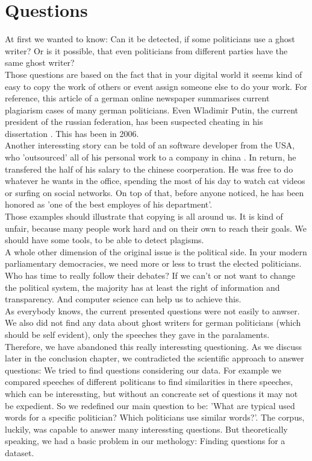 \documentclass[12pt,paper=a4,nenglish]{scrreprt}
\begin{document}
\section{Questions}
At first we wanted to know: Can it be detected, if some politicians
use a ghost writer? Or is it possible, that even politicians from different
parties have the same ghost writer? \\ 
Those questions are based on the fact that in your digital world it
seems kind of easy to copy the work of others or event assign someone else to do
your work. For reference, this article \cite{plagiat_1} of a german online newspaper 
summarises current plagiarism cases of many german politicians. 
Even Wladimir Putin, the current president of the russian federation, has been
suspected cheating in his dissertation \cite{plagiat_2}. This has been in
2006. \\
Another interessting story can be told of an software developer from the USA,
who 'outsourced' all of his personal work to a company in china
\cite{plagiat_3}. In return, he transfered the half of his salary to the chinese
coorperation. He was free to do whatever he wants in the office, spending the
most of his day to watch cat videos or surfing on social networks. 
On top of that, before anyone noticed, he has been honored as 'one of the best
employes of his department'. \\
Those examples should illustrate that copying is all around us. 
It is kind of unfair, because many people work hard and on their own to reach
their goals. We should have some tools, to be able to detect plagisms.\\
A whole other dimension of the original issue is the political side. In your
modern parliamentary democracies, we need more or less to trust the elected
politicians. Who has time to really follow their debates? If we can't or
not want to change the political system, the majority has at least the right of
information and transparency. And computer science can help us to achieve this.
\\
As everybody knows, the current presented questions were not easily to
anwser. We also did not find any data about ghost writers for german
politicians (which should be self evident), only the speeches they gave in the
paralaments.
Therefore, we have abandoned this really interessting questioning. As
we discuss later in the conclusion chapter, we contradicted the scientific
approach to answer questions: We tried to find questions considering our data. 
For example we compared speeches of different politicans to find similarities
in there speeches, which can be interessting, but without an concreate set of
questions it may not be expedient.  
So we redefined our main question to be: 'What are typical used words for a
specific politician? Which politicians use similar words?'. 
The corpus, luckily, was capable to answer many interessting questions. But
theoretically speaking, we had a basic problem in our methology: Finding questions for a
dataset. 
\end{document}
